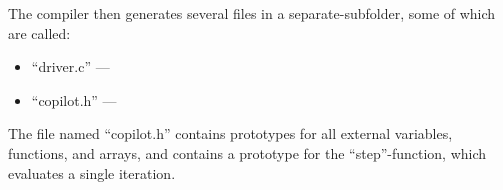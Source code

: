 The compiler then generates several files in a separate-subfolder, some of which are called:

\begin{itemize}
\item ``driver.c'' ---
\item ``copilot.h'' ---
\end{itemize}

The file named ``copilot.h'' contains prototypes for all external variables,
functions, and arrays, and contains a prototype for the ``step''-function,
which evaluates a single iteration.

